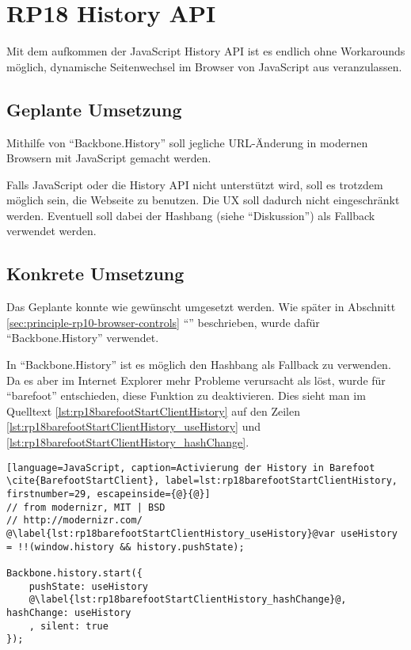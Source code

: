 \section{RP18 History API}
\label{sec:principle-rp18-history-api}

Mit dem aufkommen der JavaScript History API \cite{HistoryAPI} ist es endlich ohne Workarounds möglich, dynamische Seitenwechsel im Browser von JavaScript aus veranzulassen.

\subsection*{Geplante Umsetzung}
Mithilfe von ``Backbone.History'' \cite{BackbonejsHistory} soll jegliche URL-Änderung in modernen Browsern mit JavaScript gemacht werden.

Falls JavaScript oder die History API nicht unterstützt wird, soll es trotzdem möglich sein, die Webseite zu benutzen. Die UX soll dadurch nicht eingeschränkt werden. Eventuell soll dabei der \gls{Hashbang} (siehe ``Diskussion'') als Fallback verwendet werden.

\subsection*{Konkrete Umsetzung}
Das Geplante konnte wie gewünscht umgesetzt werden. Wie später in Abschnitt \ref{sec:principle-rp10-browser-controls} ``'' beschrieben, wurde dafür ``Backbone.History'' verwendet.

In ``Backbone.History'' ist es möglich den Hashbang als Fallback zu verwenden. Da es aber im Internet Explorer mehr Probleme verursacht als löst, wurde für ``barefoot'' entschieden, diese Funktion zu deaktivieren. Dies sieht man im Quelltext \ref{lst:rp18barefootStartClientHistory} auf den Zeilen \ref{lst:rp18barefootStartClientHistory_useHistory} und \ref{lst:rp18barefootStartClientHistory_hashChange}.

\begin{lstlisting}[language=JavaScript, caption=Activierung der History in Barefoot \cite{BarefootStartClient}, label=lst:rp18barefootStartClientHistory, firstnumber=29, escapeinside={@}{@}]
// from modernizr, MIT | BSD
// http://modernizr.com/
@\label{lst:rp18barefootStartClientHistory_useHistory}@var useHistory = !!(window.history && history.pushState);

Backbone.history.start({
	pushState: useHistory
	@\label{lst:rp18barefootStartClientHistory_hashChange}@, hashChange: useHistory
	, silent: true
});
\end{lstlisting}

